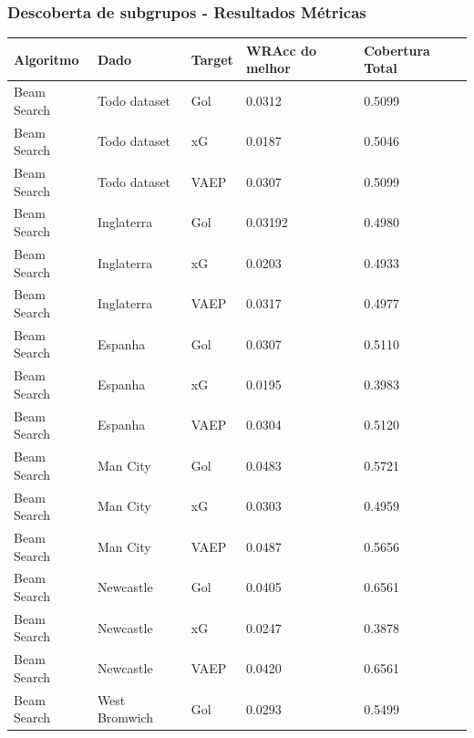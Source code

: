 \documentclass{beamer}
\begin{document}
\begin{frame}
\frametitle{Descoberta de subgrupos - Resultados Métricas}
    \begin{table}[H]
        \centering
        \begin{tabular}{|l|l|l|l|l|}
            \hline
            \textbf{Algoritmo} & \textbf{Dado} &  \textbf{Target} & 
            \textbf{WRAcc do melhor} & \textbf{Cobertura Total}
            \\
            \hline
            Beam Search & Todo dataset & Gol & 0.0312 & 0.5099 
            \\
            \hline
            Beam Search & Todo dataset & xG & 0.0187 & 0.5046 
            \\
            \hline
            Beam Search & Todo dataset & VAEP & 0.0307 & 0.5099 
            \\
            \hline
            Beam Search & Inglaterra & Gol & 0.03192 & 0.4980 
            \\
            \hline
            Beam Search & Inglaterra & xG & 0.0203 & 0.4933 
            \\
            \hline
            Beam Search & Inglaterra & VAEP & 0.0317 & 0.4977
            \\
            \hline
            Beam Search & Espanha & Gol & 0.0307 & 0.5110 
            \\
            \hline
            Beam Search & Espanha & xG & 0.0195 & 0.3983 
            \\
            \hline
            Beam Search & Espanha & VAEP & 0.0304 & 0.5120 
            \\
            \hline
            Beam Search & Man City & Gol & 0.0483 & 0.5721 
            \\
            \hline
            Beam Search & Man City & xG & 0.0303 & 0.4959 
            \\
            \hline
            Beam Search & Man City & VAEP & 0.0487 & 0.5656 
            \\
            \hline
            Beam Search & Newcastle & Gol & 0.0405 & 0.6561 
            \\
            \hline
            Beam Search & Newcastle & xG & 0.0247 & 0.3878 
            \\
            \hline
            Beam Search & Newcastle & VAEP & 0.0420 & 0.6561 
            \\
            \hline
            Beam Search & West Bromwich & Gol & 0.0293 & 0.5499 
            \\

\end{tabular}
\end{table}
\end{frame}
\end{document}
